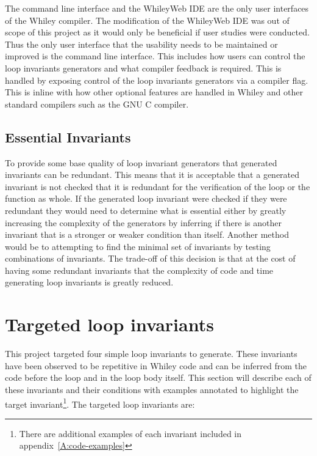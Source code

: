 The command line interface and the WhileyWeb IDE are the only user interfaces
of the Whiley compiler.
The modification of the WhileyWeb IDE was out of scope of this project as it
would only be beneficial if user studies were conducted.
Thus the only user interface that the usability needs to be maintained or
improved is the command line interface.
This includes how users can control the loop invariants generators and what
compiler feedback is required.
This is handled by exposing control of the loop invariants generators via
a compiler flag.
This is inline with how other optional features are handled in Whiley and
other standard compilers such as the GNU C compiler.

\subsection{Essential Invariants}\label{s:essential-inv}

To provide some base quality of loop invariant generators that generated invariants 
can be redundant.
This means that it is acceptable that a generated invariant is not
checked that it is redundant for the verification of the loop or the function
as whole.
If the generated loop invariant were checked if they were redundant
they would need to determine what is essential either by greatly increasing
the complexity of the generators by inferring if there is another invariant
that is a stronger or weaker condition than itself.
Another method would be to attempting to find the
minimal set of invariants by testing combinations of invariants.
The trade-off of this decision is that at the cost of having some redundant
invariants that the complexity of code and time generating loop invariants is
greatly reduced.

\section{Targeted loop invariants}\label{s:target-loop-inv}

This project targeted four simple loop invariants to generate.
These invariants have been observed to be repetitive in Whiley code and 
can be inferred from the code before the loop and  in the loop body itself.
This section will describe each of these invariants and their conditions
with examples annotated to highlight the target invariant\footnote{There are additional examples of each invariant included in appendix~\ref{A:code-examples}}.
The targeted loop invariants are:

